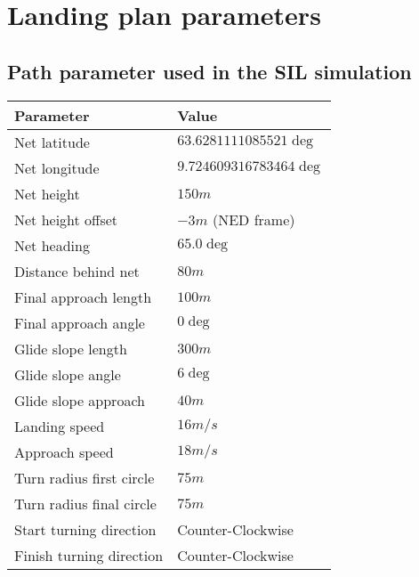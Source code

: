 \chapter{Landing plan parameters}

\section{Path parameter used in the SIL simulation}

\begin{table}
\centering
\begin{tabular}{| p{4cm} | p{4cm} |}
\hline
\textbf{Parameter}			& \textbf{Value}			\\ \hline
Net latitude				& $63.6281111085521 \deg$ 	\\ \hline
Net longitude				& $9.724609316783464 \deg$ 	\\ \hline
Net height					& $150 m$					\\ \hline
Net height offset			& $-3 m$ (NED frame)		\\ \hline
Net heading					& $65.0 \deg$				\\ \hline
Distance behind net			& $80 m$					\\ \hline
Final approach length		& $100 m$					\\ \hline
Final approach angle		& $0 \deg$					\\ \hline
Glide slope length			& $300 m $					\\ \hline
Glide slope angle			& $6 \deg$					\\ \hline
Glide slope approach		& $40 m$					\\ \hline
Landing speed				& $16 m/s$					\\ \hline
Approach speed				& $18 m/s$					\\ \hline
Turn radius first circle	& $75 m$					\\ \hline
Turn radius final circle	& $75 m$					\\ \hline
Start turning direction		& Counter-Clockwise			\\ \hline
Finish turning direction	& Counter-Clockwise			\\ \hline
\end{tabular}
\end{table}

